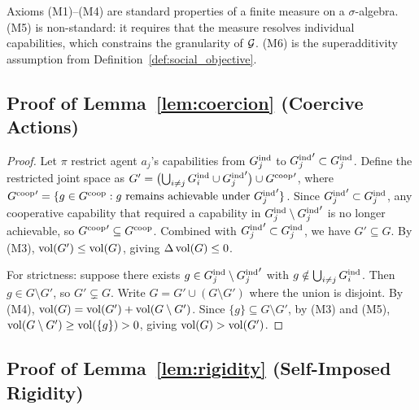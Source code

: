Axioms (M1)--(M4) are standard properties of a finite measure on a
$\sigma$-algebra. (M5) is non-standard: it requires that the measure resolves
individual capabilities, which constrains the granularity of $\mathcal{G}$. (M6) is the
superadditivity assumption from Definition~\ref{def:social_objective}.


\subsection{Proof of Lemma~\ref{lem:coercion} (Coercive Actions)}
\label{app:proof_coercion}

\begin{proof}
Let $\pi$ restrict agent $a_j$'s capabilities from $G_{j}^{\mathrm{ind}}$ to
${G_{j}^{\mathrm{ind}}}' \subset G_{j}^{\mathrm{ind}}$. Define the restricted joint space as
$G' = \bigl(\bigcup_{i \neq j} G_{i}^{\mathrm{ind}} \cup {G_{j}^{\mathrm{ind}}}'\bigr) \cup
{G^{\mathrm{coop}}}'$, where ${G^{\mathrm{coop}}}' = \{g \in G^{\mathrm{coop}} : g \text{ remains achievable
under } {G_{j}^{\mathrm{ind}}}'\}$. Since ${G_{j}^{\mathrm{ind}}}' \subset G_{j}^{\mathrm{ind}}$, any
cooperative capability that required a capability in $G_{j}^{\mathrm{ind}} \setminus
{G_{j}^{\mathrm{ind}}}'$ is no longer achievable, so ${G^{\mathrm{coop}}}' \subseteq G^{\mathrm{coop}}$.
Combined with ${G_{j}^{\mathrm{ind}}}' \subset G_{j}^{\mathrm{ind}}$, we have $G' \subseteq G$.
By (M3), $\operatorname{vol}(G') \leq \operatorname{vol}(G)$, giving $\Delta \operatorname{vol}(G) \leq 0$.

For strictness: suppose there exists $g \in G_{j}^{\mathrm{ind}} \setminus {G_{j}^{\mathrm{ind}}}'$
with $g \notin \bigcup_{i \neq j} G_{i}^{\mathrm{ind}}$. Then $g \in G \setminus G'$,
so $G' \subsetneq G$. Write $G = G' \cup (G \setminus G')$ where the union
is disjoint. By (M4), $\operatorname{vol}(G) = \operatorname{vol}(G') + \operatorname{vol}(G \setminus G')$. Since
$\{g\} \subseteq G \setminus G'$, by (M3) and (M5),
$\operatorname{vol}(G \setminus G') \geq \operatorname{vol}(\{g\}) > 0$, giving
$\operatorname{vol}(G) > \operatorname{vol}(G')$.
\end{proof}


\subsection{Proof of Lemma~\ref{lem:rigidity} (Self-Imposed Rigidity)}
\label{app:proof_rigidity}

